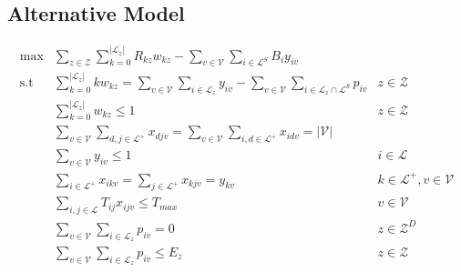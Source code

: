 \subsection{Alternative Model}
\renewcommand{\theequation}{B.\arabic{equation}}
\setcounter{equation}{0}
\begin{eqnarray}
        \max & \displaystyle\sum_{z\in \mathcal{Z}}\displaystyle\sum_{k=0}^{|\mathcal{L}_z|} R_{kz}w_{kz} - \displaystyle\sum_{v\in \mathcal{V}} \displaystyle\sum_{i \in \mathcal{L}^{S}} B_{i}y_{iv} \label{eq:obj_A}\\
        \text{s.t} & \displaystyle\sum_{k=0}^{|\mathcal{L}_z|}kw_{kz} = \displaystyle\sum_{v\in \mathcal{V}} \displaystyle\sum_{i \in \mathcal{L}_{z}} y_{iv} -  \displaystyle\sum_{v\in \mathcal{V}} \displaystyle\sum_{i \in \mathcal{L}_{z} \cap \mathcal{L}^{S}} p_{iv} & z \in \mathcal{Z}\label{eq:determine_w_A} \\
        & \displaystyle\sum_{k=0}^{|\mathcal{L}_z|}w_{kz} \leq 1 & z \in \mathcal{Z}\label{eq:one_w_A}\\
        & \displaystyle\sum_{v\in \mathcal{V}} \displaystyle\sum_{d,j\in \mathcal{L}^+}x_{djv} = \displaystyle\sum_{v\in \mathcal{V}} \displaystyle\sum_{i,d\in \mathcal{L}^+}x_{idv} = |\mathcal{V}|  \label{eq:const_deopt_A}\\ 
	    & \displaystyle\sum_{v\in \mathcal{V}}y_{iv} \leq 1 & i \in \mathcal{L} \label{eq:const_at_most_once_A}\\
	    & \displaystyle\sum_{i\in \mathcal{L}^{+}}x_{ikv} = \displaystyle\sum_{j\in \mathcal{L}^{+}}x_{kjv} = y_{kv} & k \in \mathcal{L}^{+}, v\in \mathcal{V} \label{eq:const_connectivity_A}\\
	    & \displaystyle\sum_{i,j \in \mathcal{L}} T_{ij}x_{ijv} \leq T_{max} & v\in \mathcal{V} \label{eq:const_time_A}\\
	    & \displaystyle\sum_{v\in \mathcal{V}}\displaystyle\sum_{i\in \mathcal{L}_z} p_{iv} = 0  & z\in \mathcal{Z}^D \label{eq:pickup_zone_A}\\
    	& \displaystyle\sum_{v\in \mathcal{V}}\displaystyle\sum_{i\in \mathcal{L}_z} p_{iv} \leq E_z & z\in \mathcal{Z} \label{eq:pickup_zone_2_A}\\

\end{eqnarray}
